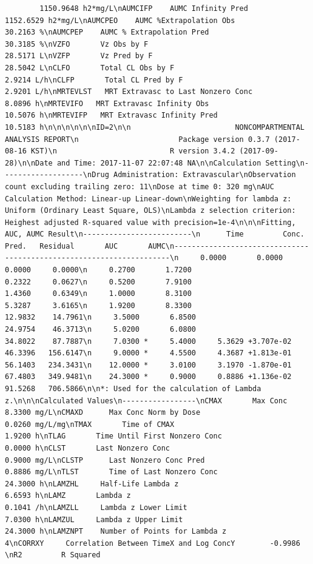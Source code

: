 \documentclass[12pt,]{krantz}
\theoremstyle{definition}
\theoremstyle{definition}
\theoremstyle{definition}
\theoremstyle{remark}
\begin{document}
\begin{verbatim}
        1150.9648 h2*mg/L\nAUMCIFP    AUMC Infinity Pred                           1152.6529 h2*mg/L\nAUMCPEO    AUMC %Extrapolation Obs                        30.2163 %\nAUMCPEP    AUMC % Extrapolation Pred                      30.3185 %\nVZFO       Vz Obs by F                                    28.5171 L\nVZFP       Vz Pred by F                                   28.5042 L\nCLFO       Total CL Obs by F                               2.9214 L/h\nCLFP       Total CL Pred by F                              2.9201 L/h\nMRTEVLST   MRT Extravasc to Last Nonzero Conc              8.0896 h\nMRTEVIFO   MRT Extravasc Infinity Obs                     10.5076 h\nMRTEVIFP   MRT Extravasc Infinity Pred                    10.5183 h\n\n\n\n\n\nID=2\n\n                        NONCOMPARTMENTAL ANALYSIS REPORT\n                       Package version 0.3.7 (2017-08-16 KST)\n                          R version 3.4.2 (2017-09-28)\n\nDate and Time: 2017-11-07 22:07:48 NA\n\nCalculation Setting\n-------------------\nDrug Administration: Extravascular\nObservation count excluding trailing zero: 11\nDose at time 0: 320 mg\nAUC Calculation Method: Linear-up Linear-down\nWeighting for lambda z: Uniform (Ordinary Least Square, OLS)\nLambda z selection criterion: Heighest adjusted R-squared value with precision=1e-4\n\n\nFitting, AUC, AUMC Result\n-------------------------\n      Time         Conc.      Pred.   Residual       AUC       AUMC\n---------------------------------------------------------------------\n     0.0000       0.0000                           0.0000     0.0000\n     0.2700       1.7200                           0.2322     0.0627\n     0.5200       7.9100                           1.4360     0.6349\n     1.0000       8.3100                           5.3287     3.6165\n     1.9200       8.3300                          12.9832    14.7961\n     3.5000       6.8500                          24.9754    46.3713\n     5.0200       6.0800                          34.8022    87.7887\n     7.0300 *     5.4000     5.3629 +3.707e-02    46.3396   156.6147\n     9.0000 *     4.5500     4.3687 +1.813e-01    56.1403   234.3431\n    12.0000 *     3.0100     3.1970 -1.870e-01    67.4803   349.9481\n    24.3000 *     0.9000     0.8886 +1.136e-02    91.5268   706.5866\n\n*: Used for the calculation of Lambda z.\n\n\nCalculated Values\n-----------------\nCMAX       Max Conc                                        8.3300 mg/L\nCMAXD      Max Conc Norm by Dose                           0.0260 mg/L/mg\nTMAX       Time of CMAX                                    1.9200 h\nTLAG       Time Until First Nonzero Conc                   0.0000 h\nCLST       Last Nonzero Conc                               0.9000 mg/L\nCLSTP      Last Nonzero Conc Pred                          0.8886 mg/L\nTLST       Time of Last Nonzero Conc                      24.3000 h\nLAMZHL     Half-Life Lambda z                              6.6593 h\nLAMZ       Lambda z                                        0.1041 /h\nLAMZLL     Lambda z Lower Limit                            7.0300 h\nLAMZUL     Lambda z Upper Limit                           24.3000 h\nLAMZNPT    Number of Points for Lambda z                   4\nCORRXY     Correlation Between TimeX and Log ConcY        -0.9986 \nR2         R Squared                                
\end{verbatim}
\end{document}
